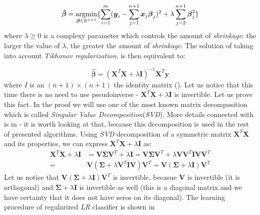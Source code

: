 \begin{equation}\label{eq:LR6}
    \boldsymbol{\hat{\beta}} = \operatorname*{argmin}_{\boldsymbol{\beta} \in \mathbb{R}^{n+1}}\{\sum\limits_{i=1}^{m}(\boldsymbol{y}_{i}-\sum\limits_{j=1}^{n+1}\boldsymbol{x}_j\boldsymbol{\beta}_j)^2+\lambda\sum\limits_{j=2}^{n+1}\boldsymbol{\beta}_j^2\}
\end{equation}
where $\lambda \geq 0$ is a complexy parameter which controls the amount of \textit{shrinkage}: the larger the value of $\lambda$, the greater the amount of \textit{shrinkage}.  The solution of  taking into account \textit{Tikhonov regularization}, is then equivalent to:

\begin{equation}\label{eq:LR7}
    \boldsymbol{\hat{\beta}} = (\boldsymbol{X}^T\boldsymbol{X}+\lambda\boldsymbol{I})^{-1}\boldsymbol{X}^T\boldsymbol{y}
\end{equation}
where $I$ is an $(n+1)\times(n+1)$ the identity matrix (\cite{Trevor}). 
Let us notice that this time there is no need to use pseudoinverse - $\boldsymbol{X}^T\boldsymbol{X}+\lambda\boldsymbol{I}$ is invertible. Let us prove this fact. In the proof we will use one of the most known matrix decomposition which is called \textit{Singular Value Decomposition}(\textit{SVD}). More details connected with  is in  - it is worth looking at that, because this decomposition is used in the rest of presented algorithms. Using \textit{SVD} decomposition of a symmetric matrix $\boldsymbol{X}^T\boldsymbol{X}$ and its properties, we can express $\boldsymbol{X}^T\boldsymbol{X}+\lambda\boldsymbol{I}$ as: 
\begin{equation}\label{eq:inv_proof}
\begin{split}
    \boldsymbol{X}^T\boldsymbol{X} + \lambda\boldsymbol{I}&=\boldsymbol{V}\boldsymbol{\Sigma}\boldsymbol{V}^T + \lambda\boldsymbol{I} = \boldsymbol{V}\boldsymbol{\Sigma}\boldsymbol{V}^T + \lambda\boldsymbol{V}\boldsymbol{V}^T\boldsymbol{I}\boldsymbol{V}\boldsymbol{V}^T \\ 
    = &\boldsymbol{V}(\boldsymbol{\Sigma} + \lambda\boldsymbol{V}^T\boldsymbol{I}\boldsymbol{V})\boldsymbol{V}^T = \boldsymbol{V}(\boldsymbol{\Sigma} + \lambda\boldsymbol{I})\boldsymbol{V}^T 
\end{split}
\end{equation}
Let us notice that $\boldsymbol{V}(\boldsymbol{\Sigma} + \lambda\boldsymbol{I})\boldsymbol{V}^T$ is invertible, becasue $\boldsymbol{V}$ is invertible (it is orthogonal) and $\boldsymbol{\Sigma} +\lambda\boldsymbol{I}$ is invertible as well (this is a diagonal matrix and we have certainty that it does not have zeros on its diagonal). The learning procedure of regularized \textit{LR} classifier is shown in 

